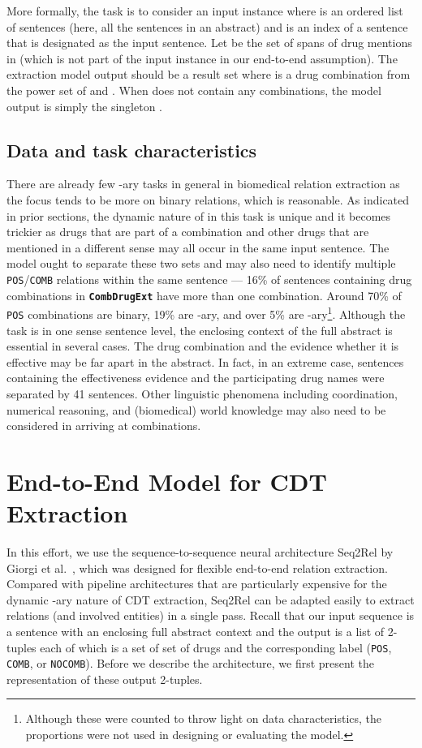 \documentclass[conference]{IEEEtran}
\begin{document}
More formally, the task is to consider an input instance   where  is an ordered list of  sentences (here, all the sentences in an abstract) and  is an index of a  sentence  that is designated as the input sentence.
Let   be the set of  spans of drug mentions in  (which is not part of the input instance in our end-to-end assumption). The extraction model  output should  be a result  set  where  is a drug combination from the power set of   and . When  does not contain any combinations, the model output is simply the singleton .


\subsection{Data and task characteristics} \label{challenges}
There are already few -ary tasks in general in biomedical relation extraction as the focus tends to be more on binary relations, which is reasonable. As indicated in prior sections, the dynamic nature of  in this task is unique and it becomes trickier as drugs that are part of a combination and other drugs that are mentioned in a different sense may all occur in the same input sentence. The model ought to separate these two sets and may also need to identify multiple \texttt{POS}/\texttt{COMB} relations within the same sentence --- 16\% of sentences containing drug combinations in \textbf{\texttt{CombDrugExt}}  have more than one combination.  Around 70\% of \texttt{POS} combinations are binary, 19\% are -ary, and over 5\% are -ary\footnote{Although these were counted to throw light on data characteristics, the proportions were not used in designing or evaluating the model.}. Although the task is in one sense sentence level, the enclosing context of the full abstract is essential in several cases. The drug combination and the evidence whether it is effective may be far apart in the abstract. In fact, in an extreme case, sentences containing the effectiveness evidence and the participating drug names were separated by 41 sentences. Other linguistic phenomena including coordination, numerical reasoning, and (biomedical) world knowledge may also need to be considered in arriving at combinations.




\section{End-to-End Model for CDT Extraction}
\label{sec-methods}
In this effort, we use the sequence-to-sequence neural architecture Seq2Rel by Giorgi et al.~\cite{giorgi-etal-2022-sequence}, which was designed for flexible end-to-end relation extraction. Compared with pipeline architectures that are particularly expensive for the dynamic -ary nature of CDT extraction, Seq2Rel can be adapted easily to extract  relations (and involved entities) in a single pass. Recall that our input sequence is a sentence with an enclosing full abstract context and the output is a list of 2-tuples each of which is a set of set of drugs and the corresponding label (\texttt{POS}, \texttt{COMB}, or \texttt{NOCOMB}). Before we describe the architecture, we first present the representation of these output 2-tuples. 
\end{document}
